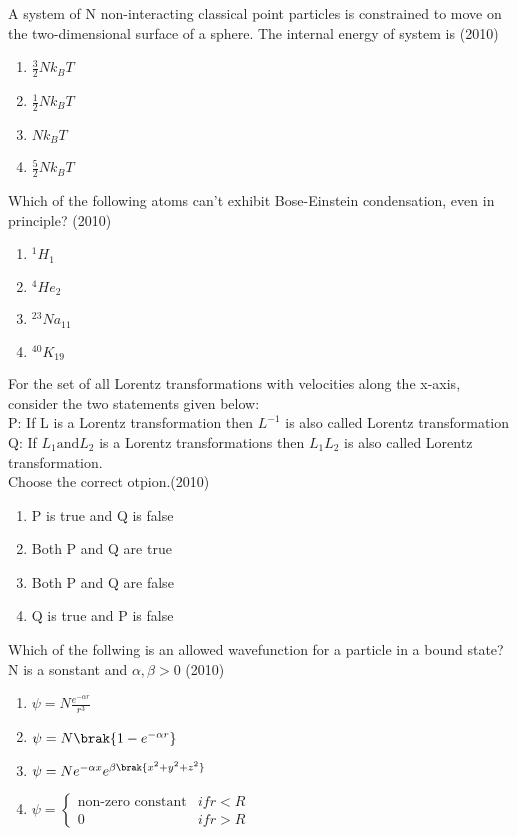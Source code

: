     \item A system of N non-interacting classical point particles is constrained to move on the two-dimensional surface of a sphere. The internal energy of system is \hfill (2010)
    \begin{enumerate}[label=(\Alph*)]
        \item $\frac{3}{2}Nk_BT$
        \item $\frac{1}{2}Nk_BT$
        \item $Nk_BT$
        \item $\frac{5}{2}Nk_BT$
    \end{enumerate} 
    \item Which of the following atoms can't exhibit Bose-Einstein condensation, even in principle? \hfill (2010)
    \begin{enumerate}[label=(\Alph*)]
        \item $^1H_1$
        \item $^4He_2$
        \item $^{23}Na_{11}$
        \item $^{40}K_{19}$
    \end{enumerate}
    \item For the set of all Lorentz transformations with velocities along the x-axis, consider the two statements given below:\\
     P: If L is a Lorentz transformation then $L^{-1}$ is also called Lorentz transformation
     \\Q: If $L_1 \text{and} L_2$ is a Lorentz transformations then $L_1L_2$ is also called Lorentz transformation.
     \\Choose the correct otpion.\hfill (2010)
     \begin{enumerate}[label=(\Alph*)]
        \item P is true and Q is false
        \item Both P and Q are true 
        \item Both P and Q are false
        \item Q is true and P is false
     \end{enumerate}
    \item Which of the follwing is an allowed wavefunction for a particle in a bound state? N is a sonstant and $\alpha,\beta>0$ \hfill (2010)
    \begin{enumerate}[label=(\Alph*)]
        \item $\psi=N\frac{e^{-\alpha r}}{r^3}$
        \item $\psi=N\brak{1-e^{-\alpha r}}$
        \item $\psi=Ne^{-\alpha x}e^{\beta\brak{x^2+y^2+z^2}}$
        \item $\psi=\begin{cases}\text{non-zero constant} & if r<R\\0 & if r>R\end{cases}$
    \end{enumerate}
